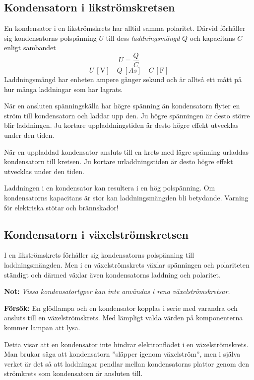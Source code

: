 \subsection{Kondensatorn i likströmskretsen}

En kondensator i en likströmskrets har alltid samma polaritet.
Därvid förhåller sig kondensatorns polspänning \(U\) till dess
\emph{laddningsmängd} \(Q\) och kapacitans \(C\) enligt sambandet
\[U = \frac{Q}{C} \]
\[U\ [\si{\volt}]\quad Q\ [As]\quad C\ [\si{\farad}]\]
Laddningsmängd har enheten ampere gånger sekund och är alltså ett mått på hur
många laddningar som har lagrats.

När en ansluten spänningskälla har högre spänning än kondensatorn flyter en 
ström till kondensatorn och laddar upp den. Ju högre spänningen är desto större 
blir laddningen. Ju kortare uppladdningstiden är desto högre effekt
utvecklas under den tiden.

När en uppladdad kondensator ansluts till en krets med lägre spänning urladdas 
kondensatorn till kretsen. Ju kortare urladdningstiden är desto högre
effekt utvecklas under den tiden.

Laddningen i en kondensator kan resultera i en hög polspänning. Om kondensatorns
kapacitans är stor kan laddningsmängden bli betydande. Varning för elektriska
stötar och brännskador!

\subsection{Kondensatorn i växelströmskretsen}

I en likströmskrets förhåller sig kondensatorns polspänning till
laddningsmängden. Men i en växelströmskrets växlar spänningen och polariteten 
ständigt och därmed växlar även kondensatorns laddning och polaritet.

\textbf{Not:} \emph{Vissa kondensatortyper kan inte användas i rena
  växelströmskretsar.}

\textbf{Försök:} En glödlampa och en kondensator kopplas i serie
med varandra och ansluts till en växelströmskrets. Med lämpligt
valda värden på komponenterna kommer lampan att lysa.

Detta visar att en kondensator inte hindrar elektronflödet i en växelströmskrets.
Man brukar säga att kondensatorn ''släpper igenom växelström'', men i själva 
verket är det så att laddningar pendlar mellan kondensatorns plattor genom den
strömkrets som kondensatorn är ansluten till.

